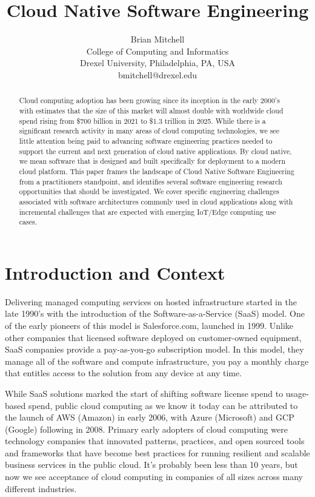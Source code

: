 \documentclass[conference]{IEEEtran}
\title{ 
        	Cloud Native Software Engineering 
      }
\author{
			Brian Mitchell\\
			College of Computing and Informatics\\
			Drexel University, Philadelphia, PA, USA\\
			bmitchell@drexel.edu
}
\date{}
\begin{document}
%

\maketitle



\begin{abstract}

Cloud computing adoption has been growing since its inception in the early 2000's with estimates that the size of this market will almost double with worldwide cloud spend rising from \$700 billion in 2021 to \$1.3 trillion in 2025\cite{IDCReport}. While there is a significant research activity in many areas of cloud computing technologies, we see little attention being paid to advancing software engineering practices needed to support the current and next generation of cloud native applications.  By cloud native, we mean software that is designed and built specifically for deployment to a modern cloud platform. This paper frames the landscape of Cloud Native Software Engineering from a practitioners standpoint, and identifies several software engineering research opportunities that should be investigated. We cover specific engineering challenges associated with  software architectures commonly used in cloud applications along with incremental challenges that are expected with emerging IoT/Edge computing use cases. 


\end{abstract}  



\section{Introduction and Context}
\label{Intro}
Delivering managed computing services on hosted infrastructure started in the late 1990's with the introduction of the Software-as-a-Service (SaaS) model. One of the early pioneers of this model is Salesforce.com, launched in 1999\cite{SalesforceHistory}.  Unlike other companies that licensed software  deployed on customer-owned equipment, SaaS companies provide a pay-as-you-go  subscription model. In this model, they manage all of the software and compute infrastructure, you pay a monthly charge that entitles access to the solution from any device at any time.     

While SaaS solutions marked the start of shifting software license spend to usage-based spend, public cloud computing as we know it today can be attributed to the launch of AWS (Amazon) \cite{AWSLaunch} in early 2006, with Azure (Microsoft)\cite{AzureLaunch} and GCP (Google)\cite{GCPLaunch} following in 2008. Primary early adopters of cloud computing were technology companies that innovated patterns, practices, and open sourced tools and frameworks that have become best practices for running resilient and scalable business services in the public cloud.  It's probably been less than 10 years, but now we see acceptance of cloud computing in companies of all sizes across many different industries. 
\end{document}
